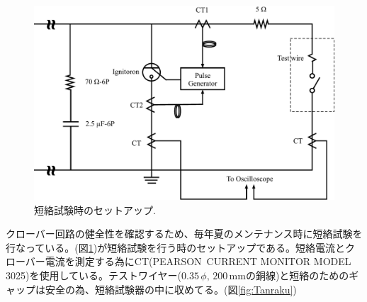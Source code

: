 \documentclass[book,openany]{jlreq}
\theoremstyle{definition}
\begin{document}
\begin{figure}[htbp]
  \begin{center}
    \includegraphics[width=12cm]{figs/Crowbar_Test.pdf}
    \caption{短絡試験時のセットアップ.}
    \label{fig:CrowbarTest}
  \end{center}
\end{figure}
%
クローバー回路の健全性を確認するため、毎年夏のメンテナンス時に短絡試験を行なっている。(図\ref{fig:CrowbarTest})が短絡試験を行う時のセットアップである。短絡電流とクローバー電流を測定する為にCT(PEARSON\texttrademark\, CURRENT MONITOR MODEL 3025)を使用している。テストワイヤー($0.35\,\phi,\, 200\,\mathrm{mm}$の銅線)と短絡のためのギャップは安全の為、短絡試験器の中に収めてる。(図\ref{fig:Tanraku})
%
\end{document}
